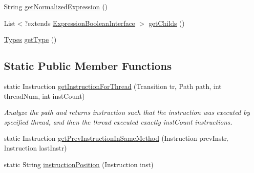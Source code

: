 \begin{DoxyCompactItemize}
String \hyperlink{classgov_1_1nasa_1_1jpf_1_1inspector_1_1server_1_1expression_1_1expressions_1_1_expression_breakpoint_position_ad8a4cb715f4790b1c347ec48de5d6a2e}{get\+Normalized\+Expression} ()
\item 
List$<$?extends \hyperlink{interfacegov_1_1nasa_1_1jpf_1_1inspector_1_1server_1_1expression_1_1_expression_boolean_interface}{Expression\+Boolean\+Interface} $>$ \hyperlink{classgov_1_1nasa_1_1jpf_1_1inspector_1_1server_1_1expression_1_1_expression_boolean_leaf_aa99bf3cf13bd8cc1d6c33208bc83b185}{get\+Childs} ()
\item 
\hyperlink{enumgov_1_1nasa_1_1jpf_1_1inspector_1_1server_1_1expression_1_1_types}{Types} \hyperlink{classgov_1_1nasa_1_1jpf_1_1inspector_1_1server_1_1expression_1_1_expression_boolean_aed010ff8683eb1e8621e226703133457}{get\+Type} ()
\end{DoxyCompactItemize}
\subsection*{Static Public Member Functions}
\begin{DoxyCompactItemize}
\item 
static Instruction \hyperlink{classgov_1_1nasa_1_1jpf_1_1inspector_1_1server_1_1expression_1_1expressions_1_1_expression_breakpoint_position_a0f561f3062c0d375227c20461bb76078}{get\+Instruction\+For\+Thread} (Transition tr, Path path, int thread\+Num, int inst\+Count)
\begin{DoxyCompactList}\small\item\em Analyze the path and returns instruction such that the instruction was executed by specified thread, and then the thread executed exactly inst\+Count instructions. \end{DoxyCompactList}\item 
static Instruction \hyperlink{classgov_1_1nasa_1_1jpf_1_1inspector_1_1server_1_1expression_1_1expressions_1_1_expression_breakpoint_position_a7f7fd767ec81e48355f6f52b494aa287}{get\+Prev\+Instruction\+In\+Same\+Method} (Instruction prev\+Instr, Instruction last\+Instr)
\item 
static String \hyperlink{classgov_1_1nasa_1_1jpf_1_1inspector_1_1server_1_1expression_1_1expressions_1_1_expression_breakpoint_position_aaecf51faa762d76b4f39c74f5b8b4e55}{instruction\+Position} (Instruction inst)
\end{DoxyCompactItemize}
